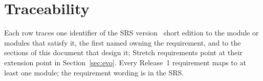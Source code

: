 \section{Traceability}\label{app:trace}

Each row traces one identifier of the SRS version~\SRSversion{} short edition to the module or modules that satisfy it, the first named owning the requirement, and to the sections of this document that design it; Stretch requirements point at their extension point in Section~\ref{sec:evo}. Every Release~1 requirement maps to at least one module; the requirement wording is in the SRS.

